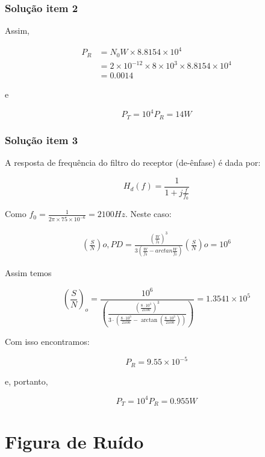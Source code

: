 \documentclass{beamer}
\begin{document}
\begin{frame}
  \frametitle{Solução item 2}

  Assim, 

\begin{align*}
  P_R &= N_0W \times 8.8154 \times 10^4 \\
     &= 2 \times 10^{-12} \times 8 \times 10^3 \times 8.8154 \times 10^4 \\
     &= 0.0014
\end{align*}

e

$$P_T = 10^4 P_R = 14 W$$

\end{frame}


\begin{frame}
  \frametitle{Solução item 3}

  A resposta de frequência do filtro do receptor (de-ênfase) é dada por: 


$$H_d(f) = \frac{1}{1+j \frac{f}{f_0}}$$

Como $f_0 = \frac{1}{2 \pi \times 75 \times 10^{-6}} = 2100Hz$. Neste caso: 

\begin{align*}
\left(\frac{S}{N}\right){o,PD} =  \frac{\left(\frac{W}{f_0} \right)^3}{3 \left( \frac{W}{f_0} - arctan \frac{W}{f_0} \right)} \left(\frac{S}{N}\right){o} = 10^6 
\end{align*}



\end{frame}

\begin{frame}
  Assim temos 

$$
\left(\frac{S}{N}\right)_{o} = \frac{10^6}{\left( \frac{\left(\frac{8 \cdot 10^3}{2100}\right)^3}{3 \cdot\left(\frac{8 \cdot 10^3}{2100}-\arctan \left(\frac{8 \cdot 10^3}{2100}\right)\right)} \right)} = 1.3541 \times 10^5
$$


Com isso encontramos: 


$$ P_R = 9.55 \times 10^{-5}$$


e, portanto, 

$$P_T = 10^4P_R = 0.955W$$

\end{frame}

\section{Figura de Ruído}
\end{document}
